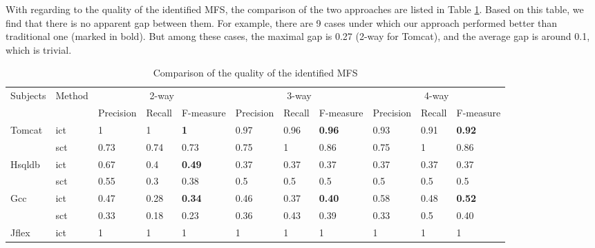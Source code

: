 \documentclass{sig-alternate}
\begin{document}

With regarding to the quality of the identified MFS, the comparison of the two approaches are listed in Table \ref{cm_elda_fglt}. Based on this table, we find that there is no apparent gap between them. For example, there are 9 cases under which our approach performed better than traditional one (marked in bold). But among these cases, the maximal gap is  0.27 (2-way for Tomcat), and the average gap is around 0.1, which is trivial.

\begin{table}[htbp]
\center
\caption{Comparison of the quality of the identified MFS}
\label{cm_elda_fglt}
\begin{tabular}{|ll|lll|lll|lll|}
\hline
\multirow{2}{*}{Subjects} & \multirow{2}{*}{Method} & \multicolumn{3}{c|}{2-way} & \multicolumn{3}{c|}{3-way} & \multicolumn{3}{c|}{4-way} \\ \cline{3-11}
                         &                        & Precision & Recall & F-measure   & Precision & Recall & F-measure & Precision & Recall & F-measure   \\ \hline
Tomcat                   & ict                    & 1    & 1    & \textbf{1}     &0.97    & 0.96   & \textbf{0.96}     &  0.93    &  0.91   &  \textbf{0.92 }       \\
                         & sct                   & 0.73    & 0.74    & 0.73      & 0.75     & 1    & 0.86        & 0.75     & 1    & 0.86         \\ \hline
Hsqldb                   & ict                    & 0.67    & 0.4    & \textbf{0.49}      & 0.37    & 0.37   & 0.37       & 0.37    & 0.37   & 0.37        \\
                         & sct                    & 0.55    & 0.3    & 0.38       & 0.5     & 0.5    & 0.5      & 0.5     & 0.5    & 0.5         \\ \hline
Gcc                      & ict                     & 0.47    & 0.28   & \textbf{0.34 }      & 0.46    & 0.37   &\textbf{ 0.40}        & 0.58    & 0.48  &\textbf{ 0.52 }       \\
                         & sct                      & 0.33    & 0.18   & 0.23        & 0.36    & 0.43   & 0.39       & 0.33     & 0.5    & 0.40      \\ \hline
Jflex                    & ict                     & 1       & 1      & 1           & 1       & 1      & 1          & 1       & 1      & 1           \\

\end{tabular}
\end{table}
\end{document}
